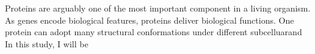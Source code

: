 Proteins are arguably one of the most important component in a living organism. As genes encode biological features, proteins deliver biological functions. One protein can adopt many structural conformations under different subcelluarand   In this study, I will be 